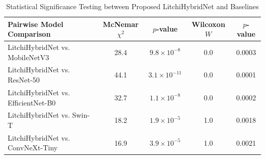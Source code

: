 \begin{table}[t]
\centering
\caption{Statistical Significance Testing between Proposed LitchiHybridNet and Baselines}
\label{tab:statistical}
\begin{tabular}{lcccc}
\toprule
\textbf{Pairwise Model Comparison} & \textbf{McNemar $\chi^2$} & \textbf{$p$-value} & \textbf{Wilcoxon $W$} & \textbf{$p$-value} \\
\midrule
LitchiHybridNet vs. MobileNetV3 & 28.4 & $9.8 \times 10^{-8}$ & 0.0 & 0.0003 \\
LitchiHybridNet vs. ResNet-50 & 44.1 & $3.1 \times 10^{-11}$ & 0.0 & 0.0001 \\
LitchiHybridNet vs. EfficientNet-B0 & 32.7 & $1.1 \times 10^{-8}$ & 0.0 & 0.0002 \\
LitchiHybridNet vs. Swin-T & 18.2 & $1.9 \times 10^{-5}$ & 1.0 & 0.0018 \\
LitchiHybridNet vs. ConvNeXt-Tiny & 16.9 & $3.9 \times 10^{-5}$ & 1.0 & 0.0021 \\
\bottomrule
\end{tabular}
\end{table}
